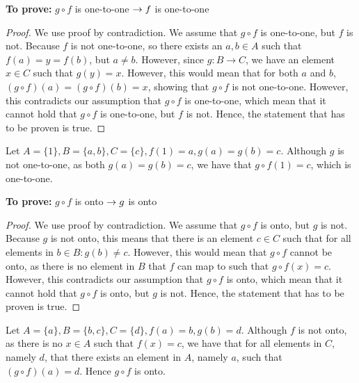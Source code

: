 \begin{solutions}
	\solution\spart\textbf{To prove:} $g\circ f$ is one-to-one $\rightarrow f$ is one-to-one
	\begin{proof}
		We use proof by contradiction. We assume that $g\circ f$ is one-to-one, but $f$ is not. Because $f$ is not one-to-one, so there exists an $a,b\in A$ such that $f(a)=y=f(b)$, but $a\neq b$. However, since $g: B\to C$, we have an element $x\in C$ such that $g(y)=x$. However, this would mean that for both $a$ and $b$, $(g\circ f)(a)=(g\circ f)(b)=x$, showing that $g\circ f$ is not one-to-one. However, this contradicts our assumption that $g\circ f$ is one-to-one, which mean that it cannot hold that $g\circ f$ is one-to-one, but $f$ is not. Hence, the statement that has to be proven is true.
	\end{proof}
	\spart Let $A=\{1\}, B=\{a, b\}, C=\{c\}, f(1)=a, g(a)=g(b)=c$. Although $g$ is not one-to-one, as both $g(a)=g(b)=c$, we have that $g\circ f(1)=c$, which is one-to-one.

	\solution\spart \textbf{To prove:} $g\circ f$ is onto $\rightarrow g$ is onto\begin{proof}
		We use proof by contradiction. We assume that $g\circ f$ is onto, but $g$ is not. Because $g$ is not onto, this means that there is an element $c\in C$ such that for all elements in $b\in B: g(b)\neq c$. However, this would mean that $g\circ f$ cannot be onto, as there is no element in $B$ that $f$ can map to such that $g\circ f(x)=c$. However, this contradicts our assumption that $g\circ f$ is onto, which mean that it cannot hold that $g\circ f$ is onto, but $g$ is not. Hence, the statement that has to be proven is true.
	\end{proof}
	\spart Let $A=\{a\}, B=\{b,c\}, C=\{d\}, f(a)=b, g(b)=d$. Although $f$ is not onto, as there is no $x\in A$ such that $f(x)=c$, we have that for all elements in $C$, namely $d$, that there exists an element in $A$, namely $a$, such that $(g\circ f)(a)=d$. Hence $g\circ f$ is onto.
\end{solutions}
